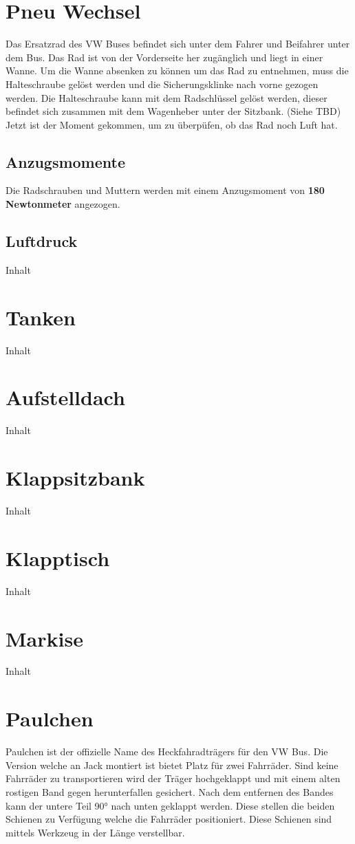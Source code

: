 \section{Pneu Wechsel}
Das Ersatzrad des VW Buses befindet sich unter dem Fahrer und Beifahrer unter dem Bus. 
Das Rad ist von der Vorderseite her zugänglich und liegt in einer Wanne.
Um die Wanne absenken zu können um das Rad zu entnehmen, muss die Halteschraube gelöst werden und die Sicherungsklinke nach vorne gezogen werden. 
Die Halteschraube kann mit dem Radschlüssel gelöst werden, dieser befindet sich zusammen mit dem Wagenheber unter der Sitzbank. (Siehe TBD)
Jetzt ist der Moment gekommen, um zu überpüfen, ob das Rad noch Luft hat.

\subsection{Anzugsmomente}
Die Radschrauben und Muttern werden mit einem Anzugsmoment von \textbf{180 Newtonmeter} angezogen.
\subsection{Luftdruck}
Inhalt
\section{Tanken}
Inhalt
\section{Aufstelldach}
Inhalt
\section{Klappsitzbank}
Inhalt
\section{Klapptisch}
Inhalt
\section{Markise}
Inhalt

\section{Paulchen}
Paulchen ist der offizielle Name des Heckfahradträgers für den VW Bus.
Die Version welche an Jack montiert ist bietet Platz für zwei Fahrräder.
Sind keine Fahrräder zu transportieren wird der Träger hochgeklappt und mit einem alten rostigen Band gegen herunterfallen gesichert.
Nach dem entfernen des Bandes kann der untere Teil 90° nach unten geklappt werden.
Diese stellen die beiden Schienen zu Verfügung welche die Fahrräder positioniert.
Diese Schienen sind mittels Werkzeug in der Länge verstellbar.

